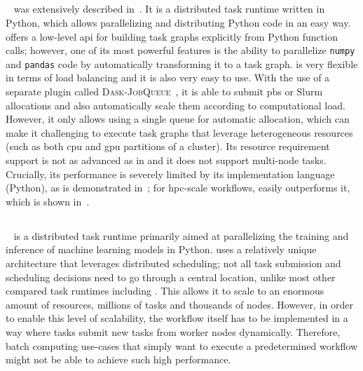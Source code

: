 \begin{spacing}{1}
\subsection*{\dask}
\dask~\cite{dask} was extensively described in~. It is a
distributed task runtime written in Python, which allows parallelizing and distributing Python code
in an easy way. \dask{} offers a low-level \gls{api} for building
task graphs explicitly from Python function calls; however, one of its most powerful features is the
ability to parallelize \texttt{numpy} and \texttt{pandas} code by automatically
transforming it to a task graph. \dask{} is very flexible in terms of load
balancing and it is also very easy to use. With the use of a separate plugin called
\textsc{Dask-JobQueue}~\cite{dask-jobqueue}, it is able to submit \gls{pbs} or
Slurm allocations and also automatically scale them according to computational load. However, it
only allows using a single queue for automatic allocation, which can make it challenging to execute
task graphs that leverage heterogeneous resources (such as both \gls{cpu} and
\gls{gpu} partitions of a cluster). Its resource requirement support is not as advanced as in \hyperqueue{} and it does not
support multi-node tasks. Crucially, its performance is severely limited by its implementation
language (Python), as is demonstrated in~; for \gls{hpc}-scale
workflows, \hyperqueue{} easily outperforms it, which is shown
in~.

\subsection*{\ray}
\ray~\cite{ray} is a distributed task runtime primarily aimed at parallelizing the
training and inference of machine learning models in Python. \ray{} uses a
relatively unique architecture that leverages distributed scheduling; not all task submission and
scheduling decisions need to go through a central location, unlike most other compared task runtimes including \hyperqueue{}. This allows it to scale to an
enormous amount of resources, millions of tasks and thousands of nodes. However, in order to enable
this level of scalability, the workflow itself has to be implemented in a way where tasks submit
new tasks from worker nodes dynamically. Therefore, batch computing use-cases that simply want to
execute a predetermined workflow might not be able to achieve such high performance.


\end{spacing}
